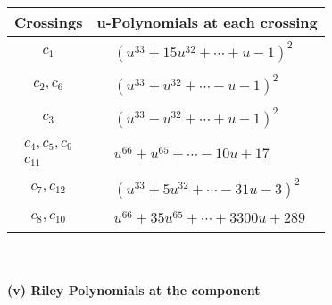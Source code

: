 \documentclass[1p]{elsarticle_modified}
\theoremstyle{definition}
\begin{document}
\begin{tabular}{m{50pt}|m{274pt}}
Crossings & \hspace{64pt}u-Polynomials at each crossing \\
\hline $$\begin{aligned}c_{1}\end{aligned}$$&$\begin{aligned}
&(u^{33}+15 u^{32}+\cdots+u-1)^{2}
\end{aligned}$\\
\hline $$\begin{aligned}c_{2},c_{6}\end{aligned}$$&$\begin{aligned}
&(u^{33}+u^{32}+\cdots- u-1)^{2}
\end{aligned}$\\
\hline $$\begin{aligned}c_{3}\end{aligned}$$&$\begin{aligned}
&(u^{33}- u^{32}+\cdots+u-1)^{2}
\end{aligned}$\\
\hline $$\begin{aligned}c_{4},c_{5},c_{9}\\c_{11}\end{aligned}$$&$\begin{aligned}
&u^{66}+u^{65}+\cdots-10 u+17
\end{aligned}$\\
\hline $$\begin{aligned}c_{7},c_{12}\end{aligned}$$&$\begin{aligned}
&(u^{33}+5 u^{32}+\cdots-31 u-3)^{2}
\end{aligned}$\\
\hline $$\begin{aligned}c_{8},c_{10}\end{aligned}$$&$\begin{aligned}
&u^{66}+35 u^{65}+\cdots+3300 u+289
\end{aligned}$\\
\hline
\end{tabular}\\~\\
\newpage\renewcommand{\arraystretch}{1}
\flushleft \textbf{(v) Riley Polynomials at the component}\newline \\
\end{document}
